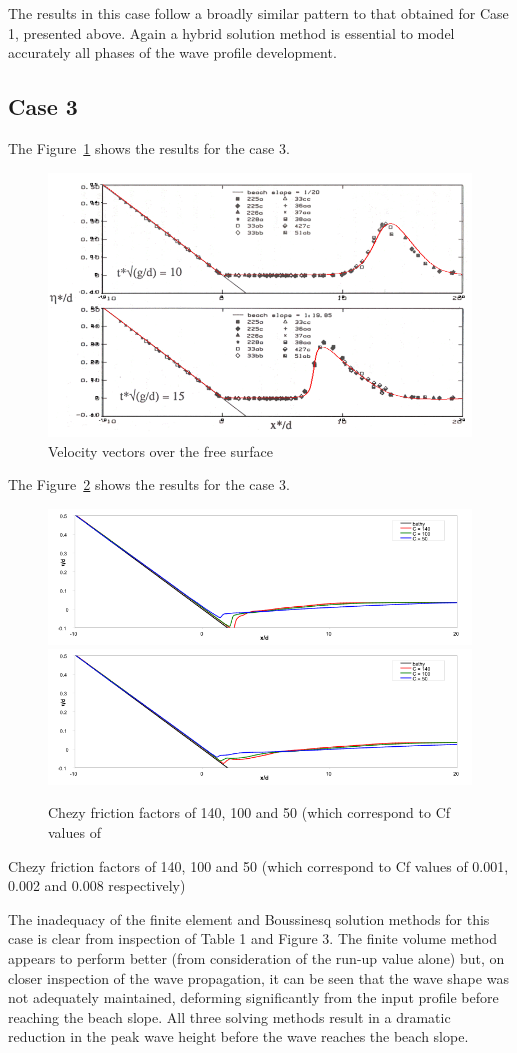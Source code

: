 The results in this case follow a broadly similar pattern to that obtained for
Case 1, presented above.  Again a hybrid solution method is essential to model
accurately all phases of the wave profile development.

\subsection{Case 3}

The Figure~\ref{fig:tests:case3} shows the results for the case 3.
\begin{figure}
\centering
\includegraphics[width=.6\textwidth]{img/case3.png}
\caption{Velocity vectors over the free surface}\label{fig:tests:case3}
\end{figure}


The Figure~\ref{fig:tests:chezy} shows the results for the case 3.
\begin{figure}
\centering
\includegraphics[width=.6\textwidth]{img/chezy1.png}
\includegraphics[width=.6\textwidth]{img/chezy2.png}
\caption{Chezy friction factors of 140, 100 and 50 (which correspond to Cf values of}\label{fig:tests:chezy}
\end{figure}

Chezy friction factors of 140, 100 and 50 (which correspond to Cf values of
0.001, 0.002 and 0.008 respectively)

The inadequacy of the finite element and Boussinesq solution methods for this
case is clear from inspection of Table 1 and Figure 3.  The finite volume
method appears to perform better (from consideration of the run-up value alone)
but, on closer inspection of the wave propagation, it can be seen that the wave
shape was not adequately maintained, deforming significantly from the input
profile before reaching the beach slope. All three solving methods result in a
dramatic reduction in the peak wave height before the wave reaches the beach
slope.

